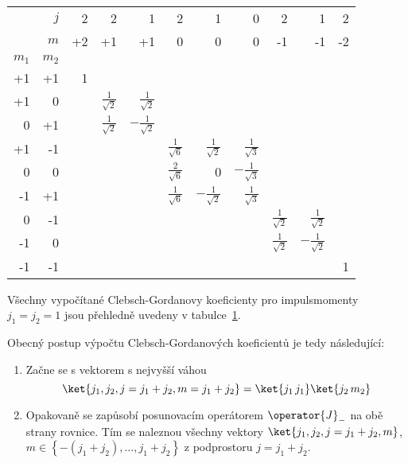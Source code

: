 \begin{solution}
	\begin{table}[!htbp]
		\centering
		\begin{tabular}{|rr||r|rr|rrr|rr|r|}
			\hline
			& $j$ & 2  & 2  & 1  & 2 & 1 & 0 & 2  & 1  & 2 \\
			& $m$ & +2 & +1 & +1 & 0 & 0 & 0 & -1 & -1 & -2\\
			$m_{1}$ & $m_{2}$ & & & & & & & & &\\
			\hline\hline
			+1 & +1 & 1 & & & & & & & &\\
			\hline
			+1 & 0  & & $\frac{1}{\sqrt{2}}$ & $\frac{1}{\sqrt{2}}$ & & & & & &\\
			0 & +1  & & $\frac{1}{\sqrt{2}}$ & $-\frac{1}{\sqrt{2}}$ & & & & & &\\
			\hline
			+1 & -1  & & & & $\frac{1}{\sqrt{6}}$ & $\frac{1}{\sqrt{2}}$ & 
				$\frac{1}{\sqrt{3}}$ & & &\\
			0 & 0  & & & & $\frac{2}{\sqrt{6}}$ & 0 & $-\frac{1}{\sqrt{3}}$ & & &\\
			-1 & +1  & & & & $\frac{1}{\sqrt{6}}$ & $-\frac{1}{\sqrt{2}}$ & 
				$\frac{1}{\sqrt{3}}$ & & &\\
			\hline
			0 & -1  & & & & & & & $\frac{1}{\sqrt{2}}$ & $\frac{1}{\sqrt{2}}$ & \\
			-1 & 0  & & & & & & & $\frac{1}{\sqrt{2}}$ & $-\frac{1}{\sqrt{2}}$ & \\
			\hline
			-1 & -1 & & & & & & & & & 1\\
			\hline
		\end{tabular}
		\label{tab:AngularMomentumCoupling11}
	\end{table}

	Všechny vypočítané Clebsch-Gordanovy koeficienty pro impulsmomenty $j_{1}=j_{2}=1$ jsou přehledně uvedeny v tabulce~\ref{tab:AngularMomentumCoupling11}.


	Obecný postup výpočtu Clebsch-Gordanových koeficientů je tedy následující:
	\begin{enumerate}
		\item
			Začne se s vektorem s nejvyšší váhou
			\begin{equation}
				\ket{j_{1},j_{2},j=j_{1}+j_{2},m=j_{1}+j_{2}}
					=\ket{j_{1}\,j_{1}}\ket{j_{2}\,m_{2}}
			\end{equation}
		
		\item
			Opakovaně se zapůsobí posunovacím operátorem $\operator{J}_{-}$ na obě strany rovnice.
			Tím se naleznou všechny vektory $\ket{j_{1},j_{2},j=j_{1}+j_{2},m}$, $m\in\left\{-(j_{1}+j_{2}),\dotsc,j_{1}+j_{2}\right\}$ z podprostoru $j=j_{1}+j_{2}$.
		

\end{enumerate}
\end{solution}
